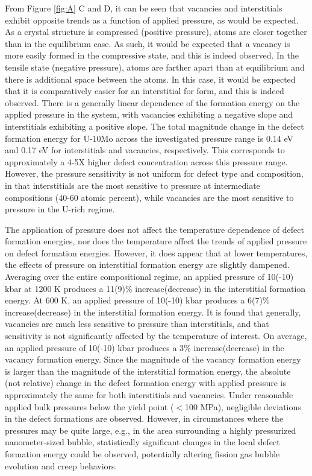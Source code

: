 \documentclass[11pt, oneside]{elsarticle}
\begin{document}
From Figure \ref{fig:A} C and D, it can be seen that vacancies and interstitials exhibit opposite trends as a function of applied pressure, as would be expected. As a crystal structure is compressed (positive pressure), atoms are closer together than in the equilibrium case. As such, it would be expected that a vacancy is more easily formed in the compressive state, and this is indeed observed. In the tensile state (negative pressure), atoms are farther apart than at equilibrium and there is additional space between the atoms. In this case, it would be expected that it is comparatively easier for an interstitial for form, and this is indeed observed. There is a generally linear dependence of the formation energy on the applied pressure in the system, with vacancies exhibiting a negative slope and interstitials exhibiting a positive slope. The total magnitude change in the defect formation energy for U-10Mo across the investigated pressure range is 0.14 eV and 0.17 eV for interstitials and vacancies, respectively. This corresponds to approximately a 4-5X higher defect concentration across this pressure range. However, the pressure sensitivity is not uniform for defect type and composition, in that interstitials are the most sensitive to pressure at intermediate compositions (40-60 atomic percent), while vacancies are the most sensitive to pressure in the U-rich regime. 

The application of pressure does not affect the temperature dependence of defect formation energies, nor does the temperature affect the trends of applied pressure on defect formation energies. However, it does appear that at lower temperatures, the effects of pressure on interstitial formation energy are slightly dampened. Averaging over the entire compositional regime, an applied pressure of 10(-10) kbar at 1200 K produces a 11(9)\% increase(decrease) in the interstitial formation energy. At 600 K, an applied pressure of 10(-10) kbar produces a 6(7)\% increase(decrease) in the interstitial formation energy. It is found that generally, vacancies are much less sensitive to pressure than interstitials, and that sensitivity is not significantly affected by the temperature of interest. On average, an applied pressure of 10(-10) kbar produces a 3\% increase(decrease) in the vacancy formation energy. Since the magnitude of the vacancy formation energy is larger than the magnitude of the interstitial formation energy, the absolute (not relative) change in the defect formation energy with applied pressure is approximately the same for both interstitials and vacancies. Under reasonable applied bulk pressures below the yield point ($<$100 MPa), negligible deviations in the defect formations are observed. However, in circumstances where the pressures may be quite large, e.g., in the area surrounding a highly pressurized nanometer-sized bubble, statistically significant changes in the local defect formation energy could be observed, potentially altering fission gas bubble evolution and creep behaviors.
\end{document}
